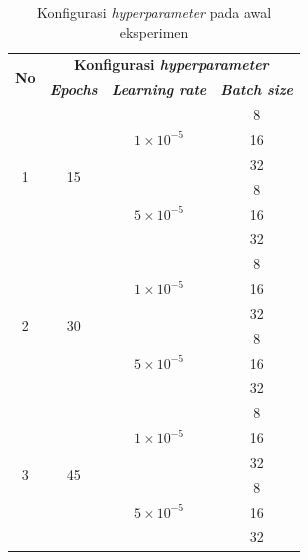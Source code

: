 \begin{table}[H]
  \centering
  \caption{Konfigurasi \textit{hyperparameter} pada awal eksperimen}  
  \label{tab:konfigurasi-hyperparameter-model}
  \begin{tabular}{|c|ccc|}
  \hline
  \multirow{2}{*}{\textbf{No}} & \multicolumn{3}{c|}{\textbf{Konfigurasi \textit{hyperparameter}}} \\ \cline{2-4} 
   & \multicolumn{1}{c|}{\textbf{\textit{Epochs}}} & \multicolumn{1}{c|}{\textbf{\textit{Learning rate}}} & \textbf{\textit{Batch size}} \\ \hline
  \multirow{6}{*}{1} & \multicolumn{1}{c|}{\multirow{6}{*}{15}} & \multicolumn{1}{c|}{\multirow{3}{*}{$1 \times 10^{-5}$}} & 8 \\ \cline{4-4} 
   & \multicolumn{1}{c|}{} & \multicolumn{1}{c|}{} & 16 \\ \cline{4-4} 
   & \multicolumn{1}{c|}{} & \multicolumn{1}{c|}{} & 32 \\ \cline{3-4} 
   & \multicolumn{1}{c|}{} & \multicolumn{1}{c|}{\multirow{3}{*}{$5 \times 10^{-5}$}} & 8 \\ \cline{4-4} 
   & \multicolumn{1}{c|}{} & \multicolumn{1}{c|}{} & 16 \\ \cline{4-4} 
   & \multicolumn{1}{c|}{} & \multicolumn{1}{c|}{} & 32 \\ \hline
  \multirow{6}{*}{2} & \multicolumn{1}{c|}{\multirow{6}{*}{30}} & \multicolumn{1}{c|}{\multirow{3}{*}{$1 \times 10^{-5}$}} & 8 \\ \cline{4-4} 
   & \multicolumn{1}{c|}{} & \multicolumn{1}{c|}{} & 16 \\ \cline{4-4} 
   & \multicolumn{1}{c|}{} & \multicolumn{1}{c|}{} & 32 \\ \cline{3-4} 
   & \multicolumn{1}{c|}{} & \multicolumn{1}{c|}{\multirow{3}{*}{$5 \times 10^{-5}$}} & 8 \\ \cline{4-4} 
   & \multicolumn{1}{c|}{} & \multicolumn{1}{c|}{} & 16 \\ \cline{4-4} 
   & \multicolumn{1}{c|}{} & \multicolumn{1}{c|}{} & 32 \\ \hline
  \multirow{6}{*}{3} & \multicolumn{1}{c|}{\multirow{6}{*}{45}} & \multicolumn{1}{c|}{\multirow{3}{*}{$1 \times 10^{-5}$}} & 8 \\ \cline{4-4} 
   & \multicolumn{1}{c|}{} & \multicolumn{1}{c|}{} & 16 \\ \cline{4-4} 
   & \multicolumn{1}{c|}{} & \multicolumn{1}{c|}{} & 32 \\ \cline{3-4} 
   & \multicolumn{1}{c|}{} & \multicolumn{1}{c|}{\multirow{3}{*}{$5 \times 10^{-5}$}} & 8 \\ \cline{4-4} 
   & \multicolumn{1}{c|}{} & \multicolumn{1}{c|}{} & 16 \\ \cline{4-4} 
   & \multicolumn{1}{c|}{} & \multicolumn{1}{c|}{} & 32 \\ \hline
  \end{tabular}
  \end{table}



